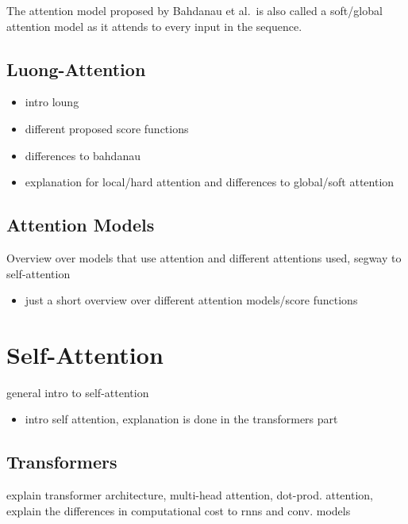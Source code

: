 \documentclass[]{krantz}
\providecommand{\tightlist}{%
  \setlength{\itemsep}{0pt}\setlength{\parskip}{0pt}}
\begin{document}
The attention model proposed by Bahdanau et al.~is also called a soft/global attention model as it attends
to every input in the sequence.

\hypertarget{luong-attention}{%
\subsection{Luong-Attention}\label{luong-attention}}

\begin{itemize}
\item
  intro loung
\item
  different proposed score functions
\item
  differences to bahdanau
\item
  explanation for local/hard attention and differences to global/soft attention
\end{itemize}

\hypertarget{attention-models}{%
\subsection{Attention Models}\label{attention-models}}

Overview over models that use attention and different attentions used, segway to self-attention

\begin{itemize}
\tightlist
\item
  just a short overview over different attention models/score functions
\end{itemize}

\hypertarget{self-attention}{%
\section{Self-Attention}\label{self-attention}}

general intro to self-attention

\begin{itemize}
\tightlist
\item
  intro self attention, explanation is done in the transformers part
\end{itemize}

\hypertarget{transformers}{%
\subsection{Transformers}\label{transformers}}

explain transformer architecture, multi-head attention, dot-prod. attention, explain the differences in computational cost to rnns and conv. models
\end{document}
